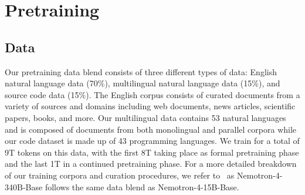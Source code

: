 \documentclass[11pt]{article}
\newcommand{\ours}{Nemotron-4-340B-Base}
\newcommand{\oursin}{Nemotron-4-340B-Instruct}
\begin{document}





\section{Pretraining} 

\subsection{Data} 

Our pretraining data blend consists of three different types of data: English natural language data (70\%), multilingual natural language data (15\%), and source code data (15\%).  The English corpus consists of curated documents from a variety of sources and domains including web
documents, news articles, scientific papers, books, and more. Our multilingual data contains 53 natural languages and is composed of documents from both monolingual and parallel corpora while our code dataset is made up of 43 programming languages. We train for a total of 9T tokens on this data, with the first 8T taking place as formal pretraining phase and the last 1T in a continued pretraining phase. For a more detailed breakdown of our training corpora and curation procedures, we refer to~\cite{parmar2024nemotron4} as \ours{} follows the same data blend as Nemotron-4-15B-Base.
\end{document}
